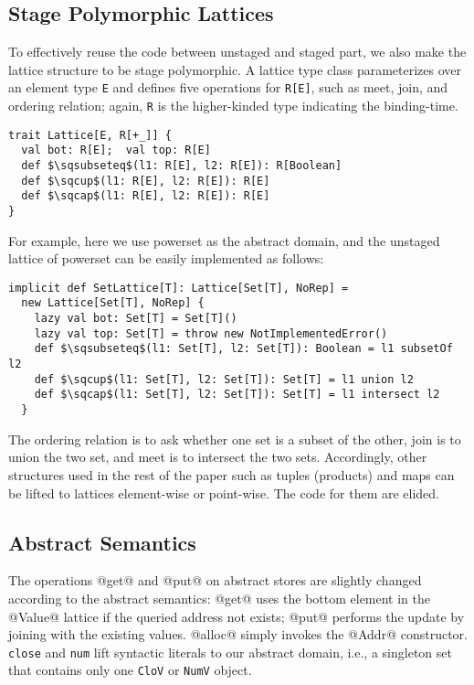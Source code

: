 \subsection{Stage Polymorphic Lattices} \label{stagedpoly_lat}
To effectively reuse the code between unstaged and staged part, we also make the lattice structure to
be stage polymorphic. A lattice type class parameterizes over an element type \texttt{E} and defines
five operations for \texttt{R[E]}, such as meet, join, and ordering relation; again, \texttt{R} 
is the higher-kinded type indicating the binding-time.
\begin{lstlisting}
trait Lattice[E, R[+_]] {
  val bot: R[E];  val top: R[E]
  def $\sqsubseteq$(l1: R[E], l2: R[E]): R[Boolean]
  def $\sqcup$(l1: R[E], l2: R[E]): R[E]
  def $\sqcap$(l1: R[E], l2: R[E]): R[E]
}
\end{lstlisting}

For example, here we use powerset as the abstract domain, and the unstaged lattice 
of powerset can be easily implemented as follows:

\begin{lstlisting}
implicit def SetLattice[T]: Lattice[Set[T], NoRep] = 
  new Lattice[Set[T], NoRep] {
    lazy val bot: Set[T] = Set[T]()
    lazy val top: Set[T] = throw new NotImplementedError()
    def $\sqsubseteq$(l1: Set[T], l2: Set[T]): Boolean = l1 subsetOf l2
    def $\sqcup$(l1: Set[T], l2: Set[T]): Set[T] = l1 union l2
    def $\sqcap$(l1: Set[T], l2: Set[T]): Set[T] = l1 intersect l2
  }
\end{lstlisting}

The ordering relation is to ask whether one set is a subset of the other, 
join is to union the two set, and meet is to intersect the two sets.
Accordingly, other structures used in the rest of the paper such as tuples 
(products) and maps can be lifted to lattices element-wise or point-wise.
The code for them are elided.

\subsection{Abstract Semantics}
The operations @get@ and @put@ on abstract stores are slightly changed according to
the abstract semantics: @get@ uses the bottom element in the @Value@ lattice if the 
queried address not exists; @put@ performs the update by joining with the existing values.
@alloc@ simply invokes the @Addr@ constructor.
\texttt{close} and \texttt{num} lift syntactic literals to our abstract domain, i.e., 
a singleton set that contains only one \texttt{CloV} or \texttt{NumV} object.

